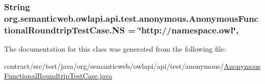 \hypertarget{classorg_1_1semanticweb_1_1owlapi_1_1api_1_1test_1_1anonymous_1_1_anonymous_functional_roundtrip_test_case_a40e310cb840ac67c73a0a91e7bec4149}{
\subsubsection[{N\-S}]{\setlength{\rightskip}{0pt plus 5cm}String org.\-semanticweb.\-owlapi.\-api.\-test.\-anonymous.\-Anonymous\-Functional\-Roundtrip\-Test\-Case.\-N\-S = \char`\"{}http\-://namespace.\-owl\char`\"{}\hspace{0.3cm}{\ttfamily [static]}, {\ttfamily [private]}}}\label{classorg_1_1semanticweb_1_1owlapi_1_1api_1_1test_1_1anonymous_1_1_anonymous_functional_roundtrip_test_case_a40e310cb840ac67c73a0a91e7bec4149}


The documentation for this class was generated from the following file\-:\begin{DoxyCompactItemize}
\item 
contract/src/test/java/org/semanticweb/owlapi/api/test/anonymous/\hyperlink{_anonymous_functional_roundtrip_test_case_8java}{Anonymous\-Functional\-Roundtrip\-Test\-Case.\-java}\end{DoxyCompactItemize}
